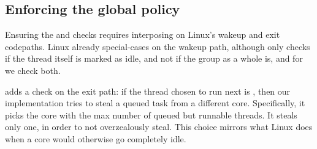 \subsection{Enforcing the global policy}\label{ss:implementation:exit}

Ensuring the \entry{} and \exit{} checks requires interposing on Linux's wakeup
and exit codepaths. Linux already special-cases on the wakeup path, although
only checks if the thread itself is marked as idle, and not if the group as a
whole is, and for \schedbe{} we check both.

\schedbe{} adds a check on the exit path: if the thread chosen to run next is
\schedbe{}, then our implementation tries to steal a queued \schednormal{} task
from a different core. Specifically, it picks the core with the max number of
queued but runnable \schednormal{} threads. It steals only one, in order to not
overzealously steal. This choice mirrors what Linux does when a core would
otherwise go completely idle.